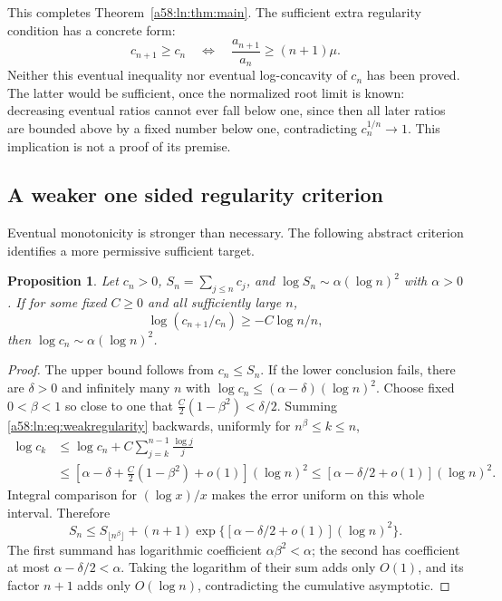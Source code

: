\documentclass[11pt,letterpaper]{article}
\newtheorem{proposition}[theorem]{Proposition}
\theoremstyle{remark}
\begin{document}
This completes Theorem~\ref{a58:ln:thm:main}. The sufficient extra regularity
condition has a concrete form:
\begin{equation}\label{a58:ln:eq:monotonicity}
 c_{n+1}\ge c_n\quad\Longleftrightarrow\quad
 \frac{a_{n+1}}{a_n}\ge(n+1)\mu.
\end{equation}
Neither this eventual inequality nor eventual log-concavity of $c_n$
has been proved. The latter would be sufficient, once the normalized
root limit is known: decreasing eventual ratios cannot ever fall below
one, since then all later ratios are bounded above by a fixed number below one,
contradicting
$c_n^{1/n}\to1$. This implication is not a proof of its premise.

\subsection{A weaker one sided regularity criterion}
Eventual monotonicity is stronger than necessary. The following abstract
criterion identifies a more permissive sufficient target.
\begin{proposition}\label{a58:ln:prop:weakregularity}
Let $c_n>0$, $S_n=\sum_{j\le n}c_j$, and
$\log S_n\sim\alpha(\log n)^2$ with $\alpha>0$.
If for some fixed $C\ge0$ and all sufficiently large $n$,
\begin{equation}\label{a58:ln:eq:weakregularity}
 \log(c_{n+1}/c_n)\ge-C\log n/n,
\end{equation}
then $\log c_n\sim\alpha(\log n)^2$.
\end{proposition}
\begin{proof}
The upper bound follows from $c_n\le S_n$. If the lower conclusion fails,
there are $\delta>0$ and infinitely many $n$ with
$\log c_n\le(\alpha-\delta)(\log n)^2$. Choose fixed $0<\beta<1$
so close to one that $\tfrac C2(1-\beta^2)<\delta/2$.
Summing \eqref{a58:ln:eq:weakregularity} backwards, uniformly for
$n^\beta\le k\le n$,
\begin{align*}
 \log c_k&\le\log c_n+C\sum_{j=k}^{n-1}\frac{\log j}{j}\\
 &\le[\alpha-\delta+\tfrac C2(1-\beta^2)+o(1)](\log n)^2
 \le[\alpha-\delta/2+o(1)](\log n)^2.
\end{align*}
Integral comparison for $(\log x)/x$ makes the error uniform on this
whole interval. Therefore
\[
 S_n\le S_{\lfloor n^\beta\rfloor}
 +(n+1)\exp\{[\alpha-\delta/2+o(1)](\log n)^2\}.
\]
The first summand has logarithmic coefficient $\alpha\beta^2<\alpha$;
the second has coefficient at most $\alpha-\delta/2<\alpha$.
Taking the logarithm of their sum adds only $O(1)$, and its factor
$n+1$ adds only $O(\log n)$, contradicting the cumulative asymptotic.
\end{proof}
\end{document}
